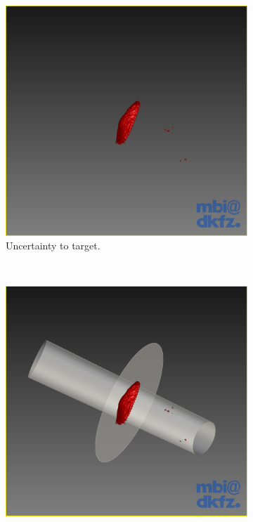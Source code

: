 \begin{figure}[H]
  \centering
  \begin{subfigure}[b]{0.32\textwidth}
    \includegraphics[width=\textwidth]{images/next_scan_plane/next_scan_plane_threshold.png}
    \caption*{Uncertainty to target.}
    \label{fig:nextscanplanethreshold}
  \end{subfigure}%
  ~ %
  \begin{subfigure}[b]{0.32\textwidth}
    \includegraphics[width=\textwidth]{images/next_scan_plane/next_scan_plane_1.png}

\end{subfigure}
\end{figure}
